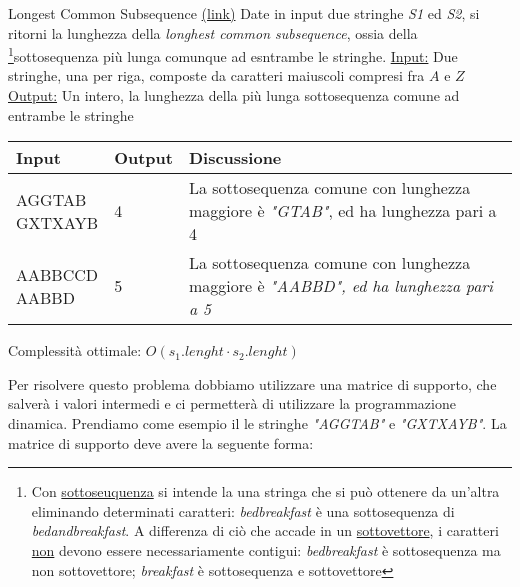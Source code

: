 \begin{esercizio}{Longest Common Subsequence \href{https://leetcode.com/problems/longest-common-subsequence/}{(link)}}
	Date in input due stringhe \textit{S1} ed \textit{S2}, si ritorni la lunghezza della \textit{longhest common subsequence}, ossia della \footnote{Con \underline{sottoseuquenza} si intende la una stringa che si può ottenere da un'altra eliminando determinati caratteri: \textit{bedbreakfast} è una sottosequenza di \textit{bedandbreakfast}. A differenza di ciò che accade in un \underline{sottovettore}, i caratteri \underline{non} devono essere necessariamente contigui: \textit{bedbreakfast} è sottosequenza ma non sottovettore; \textit{breakfast} è sottosequenza e sottovettore}{sottosequenza} più lunga comunque ad esntrambe le stringhe.
	\vskip3mm
	\underline{Input:}
	\vskip3mm Due stringhe, una per riga, composte da caratteri maiuscoli compresi fra $ A $ e $ Z $
	\vskip3mm
	\underline{Output:}
	\vskip3mm Un intero, la lunghezza della più lunga sottosequenza comune ad entrambe le stringhe
	\vskip3mm
	\renewcommand{\cellalign}{l}
	\begin{tabularx}{\textwidth}{llX}
		\toprule
		Input & Output & Discussione \\
		\midrule
		\makecell{AGGTAB             \\GXTXAYB} & 4 & La sottosequenza comune con lunghezza maggiore è \textit{"GTAB"}, ed ha lunghezza pari a 4  \\[12pt]
		\makecell{AABBCCD            \\  AABBD} & 5 & La sottosequenza comune con lunghezza maggiore è \textit{"AABBD", ed ha lunghezza pari a 5}\\
		\bottomrule
	\end{tabularx}
	\vskip3mm
	Complessità ottimale: $ O\left(s_1.lenght \cdot s_2.lenght\right) $
\end{esercizio}
Per risolvere questo problema dobbiamo utilizzare una matrice di supporto, che salverà i valori intermedi e ci permetterà di utilizzare la programmazione dinamica. Prendiamo come esempio il le stringhe \textit{"AGGTAB"} e \textit{"GXTXAYB"}. La matrice di supporto deve avere la seguente forma:
